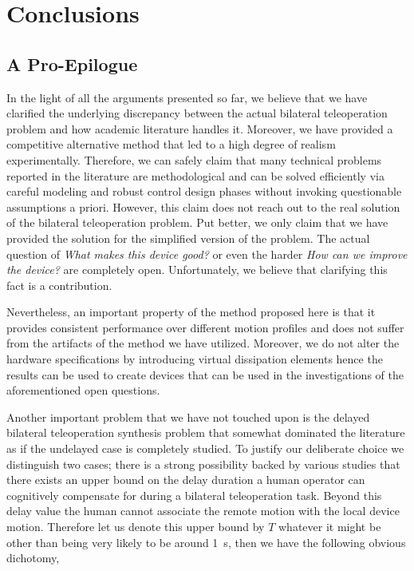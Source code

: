 \chapter{Conclusions}
\label{chap:conc}
\section{A Pro-Epilogue}
In the light of all the arguments presented so far, we believe that we have clarified the underlying discrepancy between the actual 
bilateral teleoperation problem and how academic literature handles it. Moreover, we have provided a competitive alternative method that 
led to a high degree of realism experimentally. Therefore, we can safely claim that many technical problems reported in the literature 
are methodological and can be solved efficiently via careful modeling and robust control design phases without invoking questionable 
assumptions a priori. However, this claim does not reach out to the real solution of the bilateral teleoperation problem. Put better, we 
only claim that we have provided the solution for the simplified version of the problem. The actual question of \emph{What makes this 
device good?} or even the harder \emph{How can we improve the device?} are completely open. Unfortunately, we believe that clarifying 
this fact is a contribution.

Nevertheless, an important property of the method proposed here is that it provides consistent performance over different motion profiles 
and does not suffer from the artifacts of the method we have utilized. Moreover, we do not alter the hardware specifications by introducing 
virtual dissipation elements hence the results can be used to create devices that can be used in the investigations of the aforementioned 
open questions.  

Another important problem that we have not touched upon is the delayed bilateral teleoperation synthesis problem that somewhat dominated the
literature as if the undelayed case is completely studied. To justify our deliberate choice we distinguish two cases; there is a strong 
possibility backed by various studies that there exists an upper bound on the delay duration a human operator can cognitively compensate for 
during a bilateral teleoperation task. Beyond this delay value the human cannot associate the remote motion with the local device motion. 
Therefore let us denote this upper bound by $T$ whatever it might be other than being very likely to be around \SI{1}{\second}, then we 
have the following obvious dichotomy,

